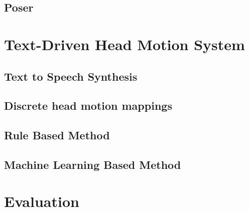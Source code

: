 \documentclass[bsc,frontabs,twoside,singlespacing,parskip]{infthesis}     %
\begin{document}
\section{Poser}


\chapter{Text-Driven Head Motion System}

\section{Text to Speech Synthesis}
\section{Discrete head motion mappings}
\section{Rule Based Method}
\section{Machine Learning Based Method}

\chapter{Evaluation}

\section{}
\section{}
\section{}



\end{document}
